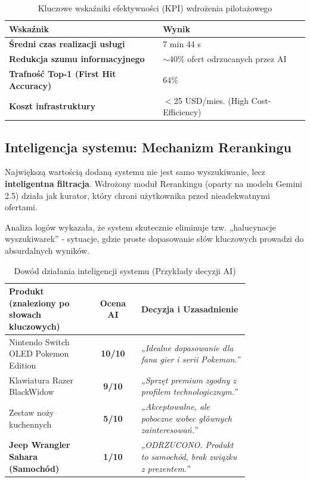 \documentclass[polish,edition=2025]{zpiday}
\begin{document}
\begin{table}[h]
    \centering
    \caption{Kluczowe wskaźniki efektywności (KPI) wdrożenia pilotażowego}
    \label{tab:metrics}
    \begin{tabular}{ll}
        \toprule
        \textbf{Wskaźnik} & \textbf{Wynik} \\
        \midrule
        \textbf{Średni czas realizacji usługi} & 7 min 44 s \\
        \textbf{Redukcja szumu informacyjnego} & $\sim$40\% ofert odrzucanych przez AI \\
        \textbf{Trafność Top-1 (First Hit Accuracy)} & 64\% \\
        \textbf{Koszt infrastruktury} & $<$25 USD/mies. (High Cost-Efficiency) \\
        \bottomrule
    \end{tabular}
\end{table}

\subsection{Inteligencja systemu: Mechanizm Rerankingu}

Największą wartością dodaną systemu nie jest samo wyszukiwanie, lecz \textbf{inteligentna filtracja}. Wdrożony moduł Rerankingu (oparty na modelu Gemini 2.5) działa jak kurator, który chroni użytkownika przed nieadekwatnymi ofertami.

Analiza logów wykazała, że system skutecznie eliminuje tzw. „halucynacje wyszukiwarek” - sytuacje, gdzie proste dopasowanie słów kluczowych prowadzi do absurdalnych wyników.

\begin{table}[h]
    \centering
    \caption{Dowód działania inteligencji systemu (Przykłady decyzji AI)}
    \label{tab:reranking}
    \begin{tabular}{p{0.35\linewidth} c p{0.45\linewidth}}
        \toprule
        \textbf{Produkt (znaleziony po słowach kluczowych)} & \textbf{Ocena AI} & \textbf{Decyzja i Uzasadnienie} \\
        \midrule
        Nintendo Switch OLED Pokemon Edition & \textbf{10/10} & \textit{„Idealne dopasowanie dla fana gier i serii Pokemon.”} \\
        \midrule
        Klawiatura Razer BlackWidow & \textbf{9/10} & \textit{„Sprzęt premium zgodny z profilem technologicznym.”} \\
        \midrule
        Zestaw noży kuchennych & \textbf{5/10} & \textit{„Akceptowalne, ale poboczne wobec głównych zainteresowań.”} \\
        \midrule
        \textbf{Jeep Wrangler Sahara (Samochód)} & \textbf{1/10} & \textit{„ODRZUCONO. Produkt to samochód, brak związku z prezentem.”} \\
        \bottomrule
    \end{tabular}
\end{table}
\end{document}
